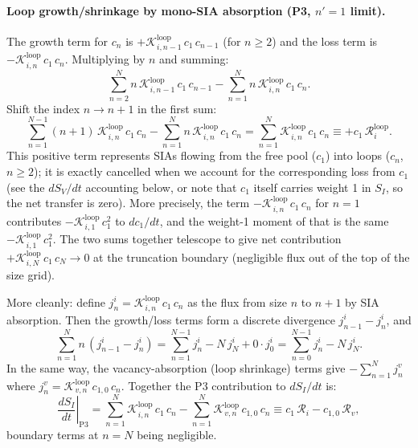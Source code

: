 \documentclass[pdflatex,sn-basic]{sn-jnl} %
\begin{document}
\paragraph{Loop growth/shrinkage by mono-SIA absorption (P3, $n'=1$ limit).}
The growth term for $c_n$ is $+\mathcal{K}_{i,n-1}^{\mathrm{loop}}\,c_1\,c_{n-1}$
(for $n \geq 2$) and the loss term is $-\mathcal{K}_{i,n}^{\mathrm{loop}}\,c_1\,c_n$.
Multiplying by $n$ and summing:
\begin{equation}
    \sum_{n=2}^{N} n\,\mathcal{K}_{i,n-1}^{\mathrm{loop}}\,c_1\,c_{n-1}
    - \sum_{n=1}^{N} n\,\mathcal{K}_{i,n}^{\mathrm{loop}}\,c_1\,c_n.
\end{equation}
Shift the index $n \to n+1$ in the first sum:
\begin{equation}
    \sum_{n=1}^{N-1}(n+1)\,\mathcal{K}_{i,n}^{\mathrm{loop}}\,c_1\,c_n
    - \sum_{n=1}^{N} n\,\mathcal{K}_{i,n}^{\mathrm{loop}}\,c_1\,c_n
    = \sum_{n=1}^{N}\mathcal{K}_{i,n}^{\mathrm{loop}}\,c_1\,c_n
    \equiv +c_1\,\mathcal{R}_i^{\mathrm{loop}}.
\end{equation}
This positive term represents SIAs flowing from the free pool ($c_1$) into
loops ($c_n$, $n \geq 2$); it is exactly cancelled when we account for the
corresponding loss from $c_1$ (see the $dS_V/dt$ accounting below, or note
that $c_1$ itself carries weight 1 in $S_I$, so the net transfer is zero).
More precisely, the term $-\mathcal{K}_{i,n}^{\mathrm{loop}}\,c_1\,c_n$ for
$n=1$ contributes $-\mathcal{K}_{i,1}^{\mathrm{loop}}\,c_1^2$ to $dc_1/dt$,
and the weight-1 moment of that is the same $-\mathcal{K}_{i,1}^{\mathrm{loop}}\,c_1^2$.
The two sums together telescope to give net contribution
$+\mathcal{K}_{i,N}^{\mathrm{loop}}\,c_1\,c_N \to 0$ at the truncation
boundary (negligible flux out of the top of the size grid).

More cleanly: define $j_n^i = \mathcal{K}_{i,n}^{\mathrm{loop}}\,c_1\,c_n$
as the flux from size $n$ to $n+1$ by SIA absorption. Then the growth/loss
terms form a discrete divergence $j_{n-1}^i - j_n^i$, and
\begin{equation}\label{eq:telescope_i}
    \sum_{n=1}^{N} n\,(j_{n-1}^i - j_n^i)
    = \sum_{n=1}^{N-1} j_n^i - N\,j_N^i + 0 \cdot j_0^i
    = \sum_{n=0}^{N-1} j_n^i - N\,j_N^i.
\end{equation}
In the same way, the vacancy-absorption (loop shrinkage) terms give
$-\sum_{n=1}^N j_{n}^v$ where $j_n^v = \mathcal{K}_{v,n}^{\mathrm{loop}}\,c_{1,0}\,c_n$.
Together the P3 contribution to $dS_I/dt$ is:
\begin{equation}\label{eq:P3_SI}
    \left.\frac{dS_I}{dt}\right|_{\mathrm{P3}}
    = \sum_{n=1}^{N}\mathcal{K}_{i,n}^{\mathrm{loop}}\,c_1\,c_n
    - \sum_{n=1}^{N}\mathcal{K}_{v,n}^{\mathrm{loop}}\,c_{1,0}\,c_n
    \equiv c_1\,\mathcal{R}_i - c_{1,0}\,\mathcal{R}_v,
\end{equation}
boundary terms at $n=N$ being negligible.
\end{document}
